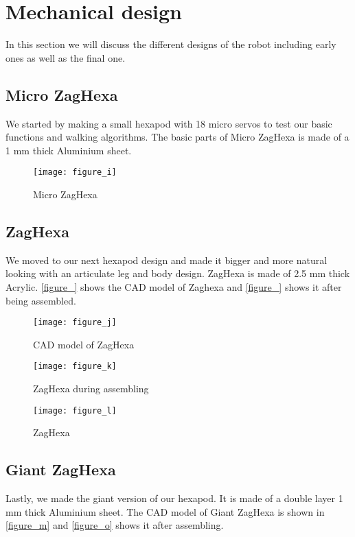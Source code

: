 \section{Mechanical design}
In this section we will discuss the different designs of the robot including early ones as well as the final one.

\subsection{Micro ZagHexa}
We started by making a small hexapod with 18 micro servos to test our basic functions and walking algorithms. The basic parts of Micro ZagHexa is made of a 1 mm thick Aluminium sheet.

\begin{figure}[h]
	\centering
	\texttt{[image: figure\_i]}
	\caption{Micro ZagHexa}
	\label{figure_i}
\end{figure}

\subsection{ZagHexa}
We moved to our next hexapod design and made it bigger and more natural looking with an articulate leg and body design. ZagHexa is made of 2.5 mm thick Acrylic. \ref{figure_} shows the CAD model of Zaghexa and \ref{figure_} shows it after being assembled.

\begin{figure}[h]
	\centering
	\texttt{[image: figure\_j]}
	\caption{CAD model of ZagHexa}
	\label{figure_j}
\end{figure}

\begin{figure}[h]
	\centering
	\texttt{[image: figure\_k]}
	\caption{ZagHexa during assembling}
	\label{figure_k}
\end{figure}

\begin{figure}[h]
	\centering
	\texttt{[image: figure\_l]}
	\caption{ZagHexa}
	\label{figure_l}
\end{figure}

\subsection{Giant ZagHexa}
Lastly, we made the giant version of our hexapod. It is made of a double layer 1 mm thick Aluminium sheet. The CAD model of Giant ZagHexa is shown in \ref{figure_m} and \ref{figure_o} shows it after assembling.
 
